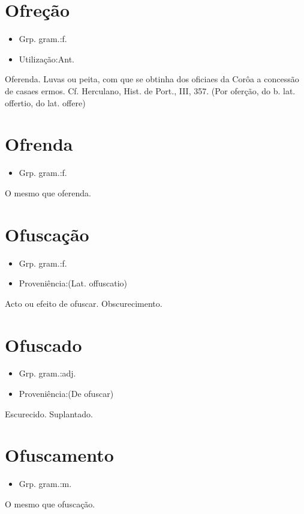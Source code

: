 \section{Ofreção}
\begin{itemize}
\item {Grp. gram.:f.}
\end{itemize}
\begin{itemize}
\item {Utilização:Ant.}
\end{itemize}
Oferenda.
Luvas ou peita, com que se obtinha dos oficiaes da Corôa a concessão de casaes ermos. Cf. Herculano, \textunderscore Hist. de Port.\textunderscore , III, 357.
(Por \textunderscore oferção\textunderscore , do b. lat. \textunderscore offertio\textunderscore , do lat. \textunderscore offere\textunderscore )
\section{Ofrenda}
\begin{itemize}
\item {Grp. gram.:f.}
\end{itemize}
O mesmo que \textunderscore oferenda\textunderscore .
\section{Ofuscação}
\begin{itemize}
\item {Grp. gram.:f.}
\end{itemize}
\begin{itemize}
\item {Proveniência:(Lat. \textunderscore offuscatio\textunderscore )}
\end{itemize}
Acto ou efeito de ofuscar.
Obscurecimento.
\section{Ofuscado}
\begin{itemize}
\item {Grp. gram.:adj.}
\end{itemize}
\begin{itemize}
\item {Proveniência:(De \textunderscore ofuscar\textunderscore )}
\end{itemize}
Escurecido.
Suplantado.
\section{Ofuscamento}
\begin{itemize}
\item {Grp. gram.:m.}
\end{itemize}
O mesmo que \textunderscore ofuscação\textunderscore .
